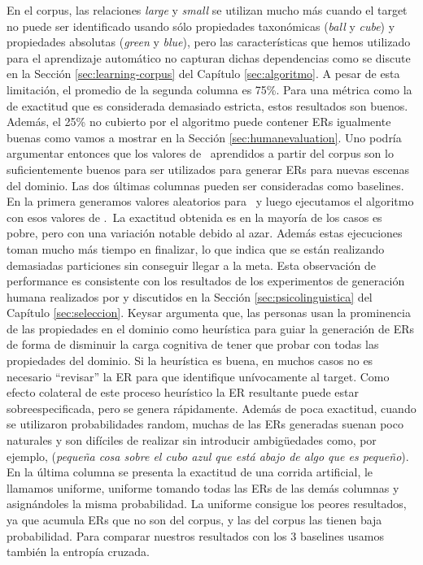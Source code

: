 En el corpus, las relaciones \emph{large} y \emph{small} se utilizan mucho m\'as cuando el target no puede ser identificado usando s\'olo propiedades taxon\'omicas (\emph{ball} y \emph{cube}) y propiedades absolutas (\emph{green} y \emph{blue}), pero las caracter\'{i}sticas que hemos utilizado para el aprendizaje autom\'atico no capturan dichas dependencias como se discute en la Secci\'on \ref{sec:learning-corpus} del Cap\'itulo \ref{sec:algoritmo}.
A pesar de esta limitaci\'on, el promedio de la segunda columna es 75\%. Para una m\'etrica como la de exactitud que es considerada demasiado estricta, estos resultados son buenos. Adem\'as, el 25\% no cubierto por el algoritmo puede contener ERs igualmente buenas como vamos a mostrar en la Secci\'on \ref{sec:humanevaluation}. Uno podr\'ia argumentar entonces que los valores de \puse\ aprendidos a partir del corpus son lo suficientemente buenos para ser utilizados para generar ERs para nuevas escenas del dominio.
Las dos \'ultimas columnas pueden ser consideradas como baselines. En la primera generamos
valores aleatorios para \puse\ y luego ejecutamos el algoritmo con esos valores de \puse.~La exactitud obtenida es en la mayor\'{i}a de los casos es pobre, pero con
una variaci\'on notable debido al azar. Adem\'as estas ejecuciones toman mucho m\'as tiempo en finalizar, lo que indica que se est\'an realizando demasiadas particiones sin conseguir llegar a la meta. Esta observaci\'on de performance es consistente con los resultados de los experimentos de generaci\'on humana realizados por \cite{keysar:Curr98} y discutidos en la Secci\'on \ref{sec:psicolinguistica} del Cap\'itulo \ref{sec:seleccion}. Keysar argumenta que, las personas usan la prominencia de las propiedades en el dominio como heur\'istica para guiar la generaci\'on de ERs de forma de disminuir la carga cognitiva de tener que probar con todas las propiedades del dominio. Si la heur\'istica es buena, en muchos casos no es necesario ``revisar'' la ER para que identifique un\'ivocamente al target. Como efecto colateral de este proceso heur\'istico la ER resultante puede estar sobreespecificada, pero se genera r\'apidamente.  
Adem\'as de poca exactitud, cuando se utilizaron probabilidades random,  muchas de las ERs generadas suenan poco naturales y son dif\'iciles de realizar sin introducir ambig\"uedades como, por ejemplo, (\textit{peque\~na cosa sobre
el cubo azul que est\'a abajo de algo que es peque\~no}). En la \'ultima columna se presenta la exactitud de una corrida artificial, le llamamos uniforme, uniforme tomando todas las ERs de las dem\'as columnas y asign\'andoles la misma probabilidad. La uniforme consigue los peores resultados, ya que acumula ERs que no son del corpus, y las del corpus las tienen baja probabilidad. Para comparar nuestros resultados con los 3 baselines usamos tambi\'en la entrop\'ia cruzada.


